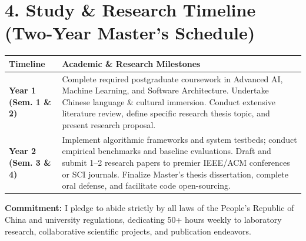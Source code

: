 \documentclass[10pt,a4paper]{article}
\begin{document}
\section{4. Study \& Research Timeline (Two-Year Master’s Schedule)}
\noindent
\begin{tabularx}{\textwidth}{|p{3.2cm}|X|}
\hline
\textbf{Timeline} & \textbf{Academic \& Research Milestones} \\ \hline
\textbf{Year 1 (Sem. 1 \& 2)} & Complete required postgraduate coursework in Advanced AI, Machine Learning, and Software Architecture. Undertake Chinese language \& cultural immersion. Conduct extensive literature review, define specific research thesis topic, and present research proposal. \\ \hline
\textbf{Year 2 (Sem. 3 \& 4)} & Implement algorithmic frameworks and system testbeds; conduct empirical benchmarks and baseline evaluations. Draft and submit 1--2 research papers to premier IEEE/ACM conferences or SCI journals. Finalize Master’s thesis dissertation, complete oral defense, and facilitate code open-sourcing. \\ \hline
\end{tabularx}

\vspace{3pt}
\noindent \textbf{Commitment:} I pledge to abide strictly by all laws of the People’s Republic of China and university regulations, dedicating 50+ hours weekly to laboratory research, collaborative scientific projects, and publication endeavors.
\end{document}
